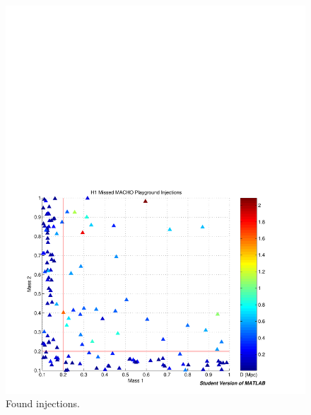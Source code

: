 \begin{figure}[p]
\begin{center}
\includegraphics[width=\textwidth]{analysis/figures/m1m2_missed}
\end{center}
\caption{\label{f:pipeline}%
Found injections.
}
\end{figure}


